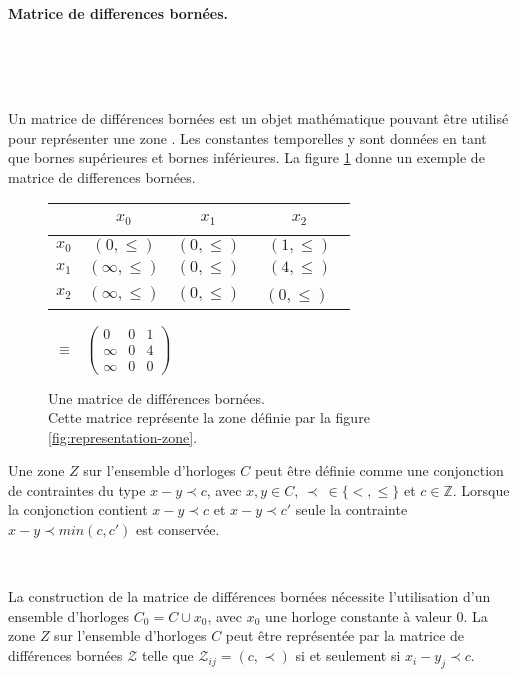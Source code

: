         \paragraph{Matrice de differences bornées.} ~

          ~

          Un matrice de différences bornées est un objet mathématique pouvant
          être utilisé pour représenter une zone \cite{dill90}. Les constantes
          temporelles y sont données en tant que bornes supérieures et bornes
          inférieures. La figure \ref{fig:matrice-diff} donne un exemple de
          matrice de differences bornées.

          \begin{figure}[!ht]
            \centering
            \begin{tabular}{c|ccc}
              ~ & $x_0$ & $x_1$ & $x_2$ \\ \hline
              $x_0 $ & $(0,\leq)$ & $(0,\leq)$ & $(1,\leq)$ \\
              $x_1 $ & $(\infty,\leq)$ & $(0,\leq)$ & $(4,\leq)$ \\
              $x_2 $ & $(\infty,\leq)$ & $(0,\leq)$ & ~$(0,\leq)$
              ~
            \end{tabular} ~$\equiv$~
              $\left(
              \begin{array}{ccc}
                0 & 0 & 1 \\
                \infty & 0 & 4 \\
                \infty & 0 & 0
              \end{array}
              \right)$

            \caption{Une matrice de différences bornées. \\
              Cette matrice représente la zone définie par la figure
              \ref{fig:representation-zone}.}
            \label{fig:matrice-diff}
          \end{figure}

          Une zone $Z$ sur l'ensemble d'horloges $C$ peut être définie comme une
          conjonction de contraintes du type $x - y \prec c$, avec $x, y \in C$,
          $\prec~\in \{<,\le\}$ et $c \in \mathbb{Z}$. Lorsque la conjonction
          contient $x - y \prec c$ et $x - y \prec c'$ seule la contrainte $x -
          y \prec min(c,c')$ est conservée.

          ~

          La construction de la matrice de différences bornées nécessite
          l'utilisation d'un ensemble d'horloges $C_0 = C \cup x_0$, avec $x_0$
          une horloge constante à valeur $0$. La zone $Z$ sur l'ensemble
          d'horloges $C$ peut être représentée par la matrice de différences
          bornées $\mathcal{Z}$ telle que $\mathcal{Z}_{ij} = (c,\prec)$ si et
          seulement si $x_i - y_j \prec c$.

